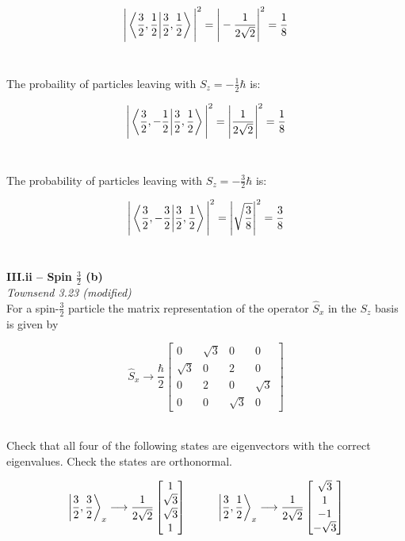 \documentclass[9pt]{extarticle}
\begin{document}
\begin{multicols*}{2}
$$\Bigg| \bra{\frac 32, \frac 12}\ket{\frac 32, \frac 12} \Bigg|^2 = \Bigg| - \frac{1}{2\sqrt 2} \Bigg|^2 = \frac 18$$ \ 

The probaility of particles leaving with $S_z = -\frac 12 \hbar$ is:

$$\Bigg| \bra{\frac 32, -\frac 12}\ket{\frac 32, \frac 12} \Bigg|^2 = \Bigg|\frac{1}{2\sqrt 2} \Bigg|^2 = \frac 18$$ \ 

The probability of particles leaving with $S_z = -\frac 32 \hbar$ is:

$$\Bigg| \bra{\frac 32, -\frac 32}\ket{\frac 32, \frac 12} \Bigg|^2 = \Bigg|\sqrt{\frac 38} \Bigg|^2 = \frac 38$$ \ 













\hrulefill 

\hfill 

{\bf \LARGE III.ii -- Spin $\frac 32$ (b)} \\ 

{\it Townsend 3.23 (modified)} \\ 
For a spin-$\frac 32$ particle the matrix representation of the operator $\hat S_x$ in the $S_z$ basis is given by

$$
\hat S_x \longrightarrow \frac \hbar 2 
\begin{bmatrix}
	0 & \sqrt 3 & 0 & 0 \\ 
	\sqrt 3 & 0 & 2 & 0 \\ 
	0 & 2 & 0 & \sqrt 3 \\ 
	0 & 0 & \sqrt 3 & 0
\end{bmatrix}
$$ \ 

Check that all four of the following states are eigenvectors with the correct eigenvalues. Check the states are orthonormal. 

$$
\ket{\frac 32 , \frac 32}_x \longrightarrow \frac{1}{2\sqrt 2} 
\begin{bmatrix}
	1 \\ 
	\sqrt 3 \\ 
	\sqrt 3 \\ 
	1
\end{bmatrix}
\hspace{1cm}
\ket{\frac 32 , \frac 12}_x \longrightarrow \frac{1}{2\sqrt 2}
\begin{bmatrix}
	\sqrt 3 \\ 
	1 \\ 
	-1 \\ 
	-\sqrt 3
\end{bmatrix}
$$


\end{multicols*}
\end{document}
